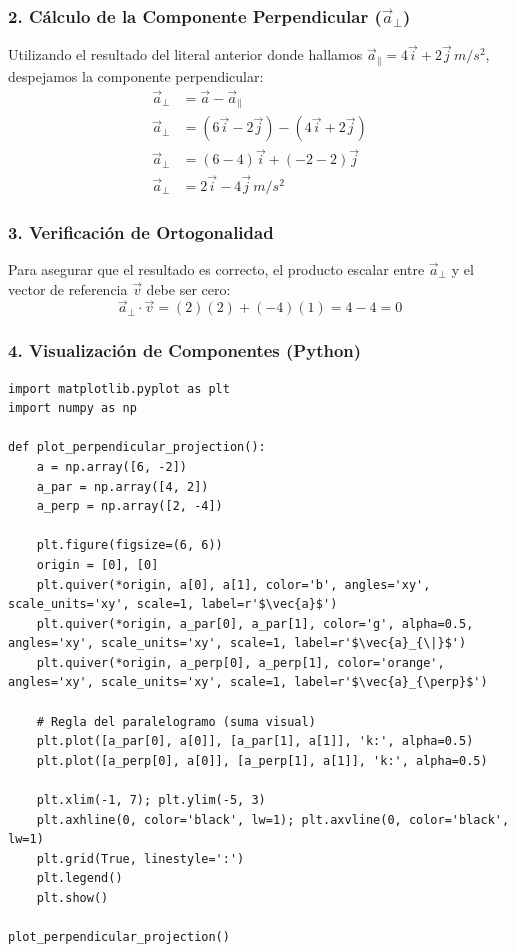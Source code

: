 \documentclass[12pt, a4paper]{article}
\begin{document}
\subsubsection*{2. Cálculo de la Componente Perpendicular ($\vec{a}_{\perp}$)}
Utilizando el resultado del literal anterior donde hallamos $\vec{a}_{\|} = 4\vec{i} + 2\vec{j} \, \si{m/s^2}$, despejamos la componente perpendicular:
\begin{align*}
    \vec{a}_{\perp} &= \vec{a} - \vec{a}_{\|} \\
    \vec{a}_{\perp} &= (6\vec{i} - 2\vec{j}) - (4\vec{i} + 2\vec{j}) \\
    \vec{a}_{\perp} &= (6 - 4)\vec{i} + (-2 - 2)\vec{j} \\
    \vec{a}_{\perp} &= 2\vec{i} - 4\vec{j} \, \si{m/s^2}
\end{align*}

\subsubsection*{3. Verificación de Ortogonalidad}
Para asegurar que el resultado es correcto, el producto escalar entre $\vec{a}_{\perp}$ y el vector de referencia $\vec{v}$ debe ser cero:
\begin{equation*}
    \vec{a}_{\perp} \cdot \vec{v} = (2)(2) + (-4)(1) = 4 - 4 = 0
\end{equation*}

\subsubsection*{4. Visualización de Componentes (Python)}
\begin{lstlisting}
import matplotlib.pyplot as plt
import numpy as np

def plot_perpendicular_projection():
    a = np.array([6, -2])
    a_par = np.array([4, 2])
    a_perp = np.array([2, -4])
    
    plt.figure(figsize=(6, 6))
    origin = [0], [0]
    plt.quiver(*origin, a[0], a[1], color='b', angles='xy', scale_units='xy', scale=1, label=r'$\vec{a}$')
    plt.quiver(*origin, a_par[0], a_par[1], color='g', alpha=0.5, angles='xy', scale_units='xy', scale=1, label=r'$\vec{a}_{\|}$')
    plt.quiver(*origin, a_perp[0], a_perp[1], color='orange', angles='xy', scale_units='xy', scale=1, label=r'$\vec{a}_{\perp}$')
    
    # Regla del paralelogramo (suma visual)
    plt.plot([a_par[0], a[0]], [a_par[1], a[1]], 'k:', alpha=0.5)
    plt.plot([a_perp[0], a[0]], [a_perp[1], a[1]], 'k:', alpha=0.5)
    
    plt.xlim(-1, 7); plt.ylim(-5, 3)
    plt.axhline(0, color='black', lw=1); plt.axvline(0, color='black', lw=1)
    plt.grid(True, linestyle=':')
    plt.legend()
    plt.show()

plot_perpendicular_projection()
\end{lstlisting}
\end{document}
